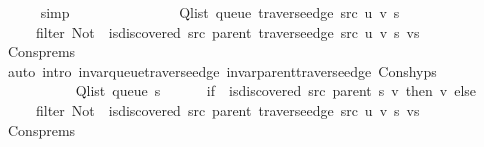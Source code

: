\begin{isabellebody}
\ \ \ \ \isamarkupfalse%
\ simp\isanewline
\ \ \isamarkupfalse%
\ \isamarkupfalse%
\isanewline
\ \ \ \ {\isachardoublequoteopen}{\isachardot}{\kern0pt}{\isachardot}{\kern0pt}{\isachardot}{\kern0pt}\ {\isacharequal}{\kern0pt}\isanewline
\ \ \ \ \ Q{\isacharunderscore}{\kern0pt}list\ {\isacharparenleft}{\kern0pt}queue\ {\isacharparenleft}{\kern0pt}traverse{\isacharunderscore}{\kern0pt}edge\ src\ u\ v\ s{\isacharparenright}{\kern0pt}{\isacharparenright}{\kern0pt}\ {\isacharat}{\kern0pt}\isanewline
\ \ \ \ \ filter\ {\isacharparenleft}{\kern0pt}Not\ {\isasymcirc}\ is{\isacharunderscore}{\kern0pt}discovered\ src\ {\isacharparenleft}{\kern0pt}parent\ {\isacharparenleft}{\kern0pt}traverse{\isacharunderscore}{\kern0pt}edge\ src\ u\ v\ s{\isacharparenright}{\kern0pt}{\isacharparenright}{\kern0pt}{\isacharparenright}{\kern0pt}\ vs{\isachardoublequoteclose}\isanewline
\ \ \ \ \isamarkupfalse%
\ Cons{\isachardot}{\kern0pt}prems\isanewline
\ \ \ \ \isamarkupfalse%
\ {\isacharparenleft}{\kern0pt}auto\ intro{\isacharcolon}{\kern0pt}\ invar{\isacharunderscore}{\kern0pt}queue{\isacharunderscore}{\kern0pt}traverse{\isacharunderscore}{\kern0pt}edge\ invar{\isacharunderscore}{\kern0pt}parent{\isacharunderscore}{\kern0pt}traverse{\isacharunderscore}{\kern0pt}edge\ Cons{\isachardot}{\kern0pt}hyps{\isacharparenright}{\kern0pt}\isanewline
\ \ \isamarkupfalse%
\ \isamarkupfalse%
\isanewline
\ \ \ \ {\isachardoublequoteopen}{\isachardot}{\kern0pt}{\isachardot}{\kern0pt}{\isachardot}{\kern0pt}\ {\isacharequal}{\kern0pt}\isanewline
\ \ \ \ \ Q{\isacharunderscore}{\kern0pt}list\ {\isacharparenleft}{\kern0pt}queue\ s{\isacharparenright}{\kern0pt}\ {\isacharat}{\kern0pt}\isanewline
\ \ \ \ \ {\isacharparenleft}{\kern0pt}if\ {\isasymnot}\ is{\isacharunderscore}{\kern0pt}discovered\ src\ {\isacharparenleft}{\kern0pt}parent\ s{\isacharparenright}{\kern0pt}\ v\ then\ {\isacharbrackleft}{\kern0pt}v{\isacharbrackright}{\kern0pt}\ else\ {\isacharbrackleft}{\kern0pt}{\isacharbrackright}{\kern0pt}{\isacharparenright}{\kern0pt}\ {\isacharat}{\kern0pt}\isanewline
\ \ \ \ \ filter\ {\isacharparenleft}{\kern0pt}Not\ {\isasymcirc}\ is{\isacharunderscore}{\kern0pt}discovered\ src\ {\isacharparenleft}{\kern0pt}parent\ {\isacharparenleft}{\kern0pt}traverse{\isacharunderscore}{\kern0pt}edge\ src\ u\ v\ s{\isacharparenright}{\kern0pt}{\isacharparenright}{\kern0pt}{\isacharparenright}{\kern0pt}\ vs{\isachardoublequoteclose}\isanewline
\ \ \ \ \isamarkupfalse%
\ Cons{\isachardot}{\kern0pt}prems{\isacharparenleft}{\kern0pt}{}{\isacharparenright}{\kern0pt}\isanewline

\end{isabellebody}
